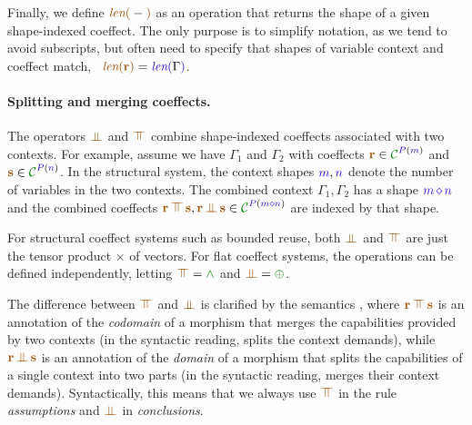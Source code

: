 Finally, we define $\alen{-}$ as an operation that returns the shape of a given shape-indexed
coeffect. The only purpose is to simplify notation, as we tend to avoid subscripts, but often need
to specify that shapes of variable context and coeffect match,
\eg~$\alen{\aclrd{\textbf{r}}} = \slen{\Gamma}$.

\paragraph{Splitting and merging coeffects.}
The operators $\apar$ and $\azip$ combine shape-indexed coeffects associated with two contexts.
For example, assume we have $\Gamma_1$ and $\Gamma_2$ with coeffects $\aclrd{\textbf{r}} \in
\C^{\SP(\sclrd{m})}$ and $\aclrd{\textbf{s}} \in \C^{\SP(\sclrd{n})}$. In the structural system, the
context shapes $\sclrd{m}, \sclrd{n}$ denote the number of variables in the two contexts. The
combined context $\Gamma_1, \Gamma_2$ has a shape $\sclrd{m}\,\stimes\,\sclrd{n}$ and the combined
coeffects $\aclrd{\textbf{r}} \,\azip\, \aclrd{\textbf{s}}, \aclrd{\textbf{r}} \,\apar\, \aclrd{\textbf{s}}
\in \C^{\SP(\sclrd{m} \stimes \sclrd{n})}$ are indexed by that shape.

For structural coeffect systems such as bounded reuse, both $\apar$ and $\azip$ are
just the tensor product $\times$ of vectors. For flat coeffect systems, the operations
can be defined independently, letting $\azip=\czip$ and $\apar=\cpar$.

The difference between $\azip$ and $\apar$ is clarified by the semantics \cite{coeffects-icfp14},
where $\aclrd{\textbf{r}}\,\azip\,\aclrd{\textbf{s}}$ is an annotation of the \emph{codomain} of
a morphism that merges the capabilities provided by two contexts (in the syntactic
reading, splits the context demands), while $\aclrd{\textbf{r}}\,\apar\,\aclrd{\textbf{s}}$
is an annotation of the \emph{domain} of a morphism that splits the capabilities of a single
context into two parts (in the syntactic reading, merges their context demands).
Syntactically, this means that we always use $\azip$ in the rule \emph{assumptions} and
$\apar$ in \emph{conclusions}.


\newcommand{\tystmt}[2]{ (\text{\footnotesize{#1}})~~{#2} }
\newcommand{\ctxtrans}[3]{ #2 \rightsquigarrow #1, #3 }
\newcommand{\ctxtransnl}[3]{ \begin{array}{l} #2 \rightsquigarrow\\ #1, #3 \end{array}}

